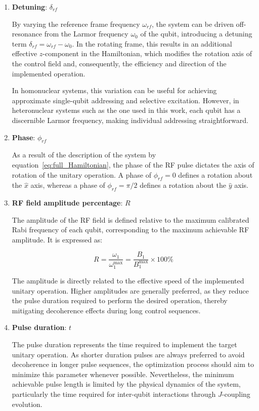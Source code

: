 \begin{enumerate}
    \item \textbf{Detuning}: \(\delta_{rf}\)
    
    By varying the reference frame frequency \(\omega_{rf}\), the system can be driven off-resonance from the Larmor frequency \(\omega_0\) of the qubit, introducing a detuning term \(\delta_{rf} = \omega_{rf} - \omega_0\). In the rotating frame, this results in an additional effective \(z\)-component in the Hamiltonian, which modifies the rotation axis of the control field and, consequently, the efficiency and direction of the implemented operation.
    
    In homonuclear systems, this variation can be useful for achieving approximate single-qubit addressing and selective excitation. However, in heteronuclear systems such as the one used in this work, each qubit has a discernible Larmor frequency, making individual addressing straightforward.
    
    \item \textbf{Phase}: \(\phi_{rf}\)

    As a result of the description of the system by equation~\ref{eq:full_Hamiltonian}, the phase of the RF pulse dictates the axis of rotation of the unitary operation. A phase of \(\phi_{rf}=0\) defines a rotation about the \(\hat{x}\) axis, whereas a phase of \(\phi_{rf}=\pi/2\) defines a rotation about the \(\hat{y}\) axis.
    
    \item \textbf{RF field amplitude percentage}: \(R\)
    
    The amplitude of the RF field is defined relative to the maximum calibrated Rabi frequency of each qubit, corresponding to the maximum achievable RF amplitude. It is expressed as:
    
    \begin{equation}
        R = \frac{\omega_1}{\omega_1^{\mathrm{\max}}}
        = \frac{B_1}{B_1^{\mathrm{\max}}} \times 100\%
    \end{equation}
    
    The amplitude is directly related to the effective speed of the implemented unitary operation. Higher amplitudes are generally preferred, as they reduce the pulse duration required to perform the desired operation, thereby mitigating decoherence effects during long control sequences.
    
    \item \textbf{Pulse duration}: \(t\)
    
    The pulse duration represents the time required to implement the target unitary operation. As shorter duration pulses are always preferred to avoid decoherence in longer pulse sequences, the optimization process should aim to minimize this parameter whenever possible. Nevertheless, the minimum achievable pulse length is limited by the physical dynamics of the system, particularly the time required for inter-qubit interactions through \(J\)-coupling evolution.
    
\end{enumerate}

